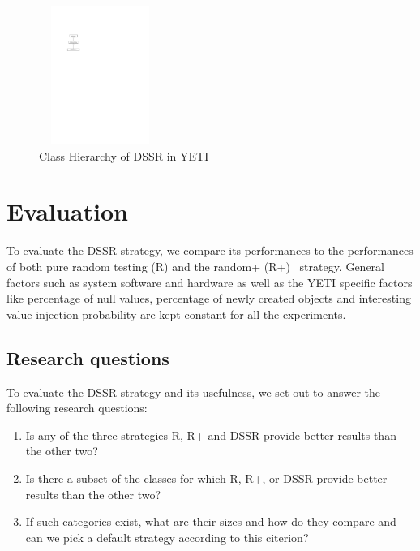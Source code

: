 \documentclass[conference]{IEEEtran}
\begin{document}
\begin{figure}[h]
\centering
\includegraphics[width=4cm,height=4.5cm]{hierarchy.pdf}
\caption{Class Hierarchy of DSSR in YETI}
\label{fig:hierarchyofDSSR}
\end{figure}







\section{Evaluation}\label{sec:eval}

To evaluate the DSSR strategy, we compare its performances to the performances of both pure random testing (R) and the random+ (R+)~\cite{Oriol2010} strategy. General factors such as system software and hardware as well as the YETI specific factors like percentage of null values, percentage of newly created objects and interesting value injection probability are kept constant for all the experiments.\\

\subsection{Research questions}
To evaluate the DSSR strategy and its usefulness, we set out to answer the following research questions:
\begin{enumerate}
\item Is any of the three strategies R, R+ and DSSR provide better results than the other two?
\item Is there a subset of the classes for which R, R+, or DSSR provide better results than the other two?
\item If such categories exist, what are their sizes and how do they compare and can we pick a default strategy according to this citerion?
\end{enumerate}
\end{document}

